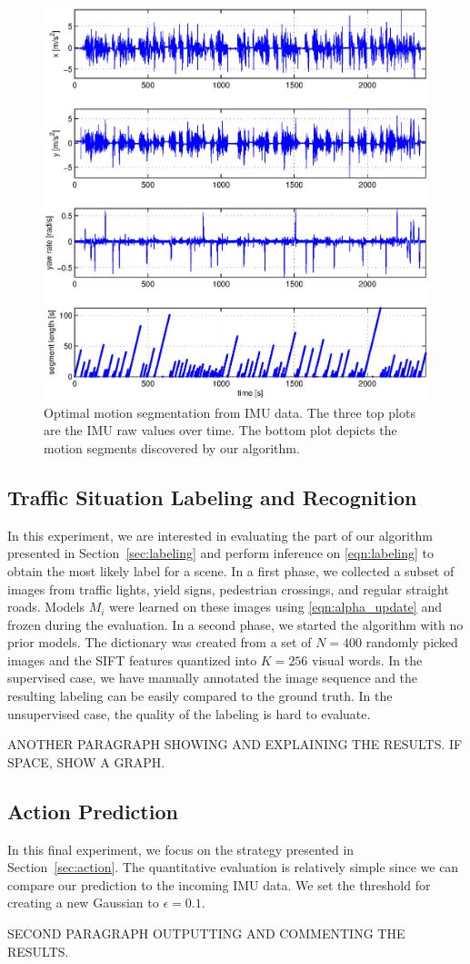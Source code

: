 \begin{figure}[t]
\centering
\includegraphics[width=0.8\columnwidth]{fig/cpResult.eps}
\caption{Optimal motion segmentation from IMU data. The three top plots are the
IMU raw values over time. The bottom plot depicts the motion segments
discovered by our algorithm.}
\label{fig:motion_segments}
\end{figure}

\subsection{Traffic Situation Labeling and Recognition}
In this experiment, we are interested in evaluating the part of our algorithm
presented in Section~\ref{sec:labeling} and perform inference on
\eqref{eqn:labeling} to obtain the most likely label for a scene. In a first
phase, we collected a subset of images from traffic lights, yield signs,
pedestrian crossings, and regular straight roads. Models $M_i$ were learned on
these images using \eqref{eqn:alpha_update} and frozen during the evaluation.
In a second phase, we started the algorithm with no prior models. The dictionary
was created from a set of $N=400$ randomly picked images and the SIFT features
quantized into $K=256$ visual words. In the supervised case, we have manually
annotated the image sequence and the resulting labeling can be easily compared
to the ground truth. In the unsupervised case, the quality of the labeling is
hard to evaluate.

ANOTHER PARAGRAPH SHOWING AND EXPLAINING THE RESULTS. IF SPACE, SHOW A GRAPH.

\subsection{Action Prediction}
In this final experiment, we focus on the strategy presented in
Section~\ref{sec:action}. The quantitative evaluation is relatively simple since
we can compare our prediction to the incoming IMU data. We set the threshold for
creating a new Gaussian to $\epsilon=0.1$.

SECOND PARAGRAPH OUTPUTTING AND COMMENTING THE RESULTS.
